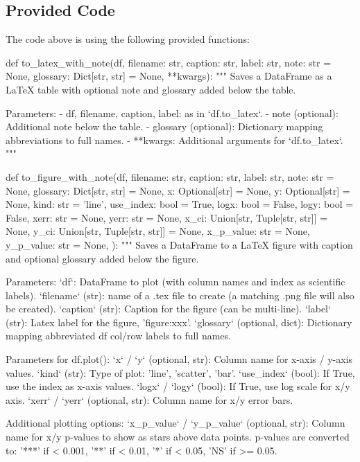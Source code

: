 \documentclass[11pt]{article}
\begin{document}
\subsection{Provided Code}
The code above is using the following provided functions:

\begin{python}
def to_latex_with_note(df, filename: str, caption: str, label: str,
                       note: str = None, glossary: Dict[str, str] = None, **kwargs):
    """
    Saves a DataFrame as a LaTeX table with optional note and glossary added below the table.

    Parameters:
    - df, filename, caption, label: as in `df.to_latex`.
    - note (optional): Additional note below the table.
    - glossary (optional): Dictionary mapping abbreviations to full names.
    - **kwargs: Additional arguments for `df.to_latex`.
    """

def to_figure_with_note(df, filename: str, caption: str, label: str,
                        note: str = None, glossary: Dict[str, str] = None, 
                        x: Optional[str] = None, y: Optional[str] = None, kind: str = 'line',
                        use_index: bool = True, 
                        logx: bool = False, logy: bool = False,
                        xerr: str = None, yerr: str = None,
                        x_ci: Union[str, Tuple[str, str]] = None, y_ci: Union[str, Tuple[str, str]] = None,
                        x_p_value: str = None, y_p_value: str = None,
                        ):
    """
    Saves a DataFrame to a LaTeX figure with caption and optional glossary added below the figure.

    Parameters:
    `df`: DataFrame to plot (with column names and index as scientific labels). 
    `filename` (str): name of a .tex file to create (a matching .png file will also be created). 
    `caption` (str): Caption for the figure (can be multi-line).
    `label` (str): Latex label for the figure, 'figure:xxx'. 
    `glossary` (optional, dict): Dictionary mapping abbreviated df col/row labels to full names.

    Parameters for df.plot():
    `x` / `y` (optional, str): Column name for x-axis / y-axis values.
    `kind` (str): Type of plot: 'line', 'scatter', 'bar'.
    `use_index` (bool): If True, use the index as x-axis values.
    `logx` / `logy` (bool): If True, use log scale for x/y axis.
    `xerr` / `yerr` (optional, str): Column name for x/y error bars.

    Additional plotting options:
    `x_p_value` / `y_p_value` (optional, str): Column name for x/y p-values to show as stars above data points.
        p-values are converted to: '***' if < 0.001, '**' if < 0.01, '*' if < 0.05, 'NS' if >= 0.05.


\end{python}
\end{document}
